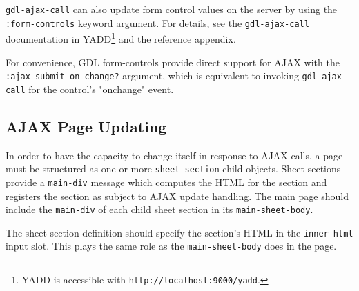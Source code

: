 \documentclass [11pt]{book}
\begin{document}
\texttt{gdl-ajax-call} can also update form control values on the server by using the \texttt{:form-controls} keyword argument. For details, see the \texttt{gdl-ajax-call} documentation in
YADD\footnote{YADD is accessible with \texttt{http://localhost:9000/yadd}.} and the reference appendix.



For convenience, GDL form-controls provide direct support for AJAX with the \texttt{:ajax-submit-on-change?}
argument, which is equivalent to invoking \texttt{gdl-ajax-call} for the control's "onchange" event.



\subsection{AJAX Page Updating}

\label{subsec:ajaxpageupdating}



In order to have the capacity to change itself in response to AJAX calls, a page must be structured
as one or more \texttt{sheet-section} child objects.  Sheet sections provide a \texttt{main-div} message
which computes the HTML for the section and registers the section as subject to AJAX update handling.  The
main page should include the \texttt{main-div} of each child sheet section in its \texttt{main-sheet-body}.



The sheet section definition should specify the section's HTML in the \texttt{inner-html} input slot.
This plays the same role as the \texttt{main-sheet-body} does in the page.
\end{document}
